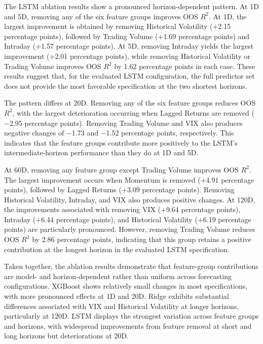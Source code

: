 \documentclass[12pt,twoside]{ord}
\makeatletter
\providecommand{\FloatBarrier}{\par\ifx\@deferlist\@empty\else\clearpage\fi}
\makeatother
\begin{document}
\FloatBarrier
The LSTM ablation results show a pronounced horizon-dependent pattern. At 1D and 5D, removing any of the six feature groups improves OOS $R^2$. At 1D, the largest improvement is obtained by removing Historical Volatility ($+$2.15 percentage points), followed by Trading Volume ($+$1.69 percentage points) and Intraday ($+$1.57 percentage points). At 5D, removing Intraday yields the largest improvement ($+$2.01 percentage points), while removing Historical Volatility or Trading Volume improves OOS $R^2$ by 1.62 percentage points in each case. These results suggest that, for the evaluated LSTM configuration, the full predictor set does not provide the most favorable specification at the two shortest horizons.

The pattern differs at 20D. Removing any of the six feature groups reduces OOS $R^2$, with the largest deterioration occurring when Lagged Returns are removed ($-$2.95 percentage points). Removing Trading Volume and VIX also produces negative changes of $-$1.73 and $-$1.52 percentage points, respectively. This indicates that the feature groups contribute more positively to the LSTM's intermediate-horizon performance than they do at 1D and 5D.

At 60D, removing any feature group except Trading Volume improves OOS $R^2$. The largest improvement occurs when Momentum is removed ($+$4.91 percentage points), followed by Lagged Returns ($+$3.09 percentage points). Removing Historical Volatility, Intraday, and VIX also produces positive changes. At 120D, the improvements associated with removing VIX ($+$9.64 percentage points), Intraday ($+$6.44 percentage points), and Historical Volatility ($+$6.19 percentage points) are particularly pronounced. However, removing Trading Volume reduces OOS $R^2$ by 2.86 percentage points, indicating that this group retains a positive contribution at the longest horizon in the evaluated LSTM specification.

Taken together, the ablation results demonstrate that feature-group contributions are model- and horizon-dependent rather than uniform across forecasting configurations. XGBoost shows relatively small changes in most specifications, with more pronounced effects at 1D and 20D. Ridge exhibits substantial differences associated with VIX and Historical Volatility at longer horizons, particularly at 120D. LSTM displays the strongest variation across feature groups and horizons, with widespread improvements from feature removal at short and long horizons but deteriorations at 20D.
\end{document}
